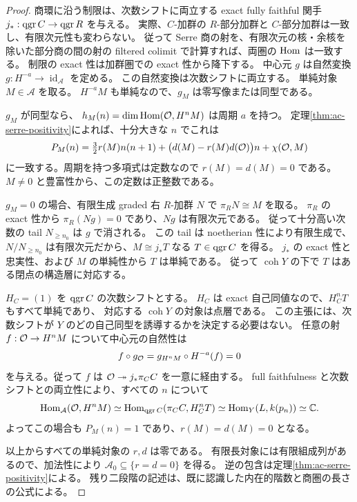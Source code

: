 \begin{proof}
商環に沿う制限は、次数シフトに両立する exact fully faithful 関手
$j_*:\operatorname{qgr} C\to\operatorname{qgr} R$ を与える。
実際、$C$-加群の $R$-部分加群と $C$-部分加群は一致し、有限次元性も変わらない。
従って Serre 商の射を、有限次元の核・余核を除いた部分商の間の射の
filtered colimit で計算すれば、両圏の $\operatorname{Hom}$ は一致する。
制限の exact 性は加群圏での exact 性から降下する。
中心元 $g$ は自然変換 $g:H^{-a}\to\operatorname{id}_{\mathcal A}$ を定める。
この自然変換は次数シフトに両立する。
単純対象 $M\in\mathcal A$ を取る。
$H^{-a}M$ も単純なので、$g_M$ は零写像または同型である。

$g_M$ が同型なら、
$h_M(n)=\dim\operatorname{Hom}(\mathcal O,H^nM)$ は周期 $a$ を持つ。
定理\ref{thm:ac-serre-positivity}によれば、十分大きな $n$ でこれは
\[
 P_M(n)=\tfrac32r(M)n(n+1)
       +\bigl(d(M)-r(M)d(\mathcal O)\bigr)n+\chi(\mathcal O,M)
\]
に一致する。周期を持つ多項式は定数なので $r(M)=d(M)=0$ である。
$M\ne0$ と豊富性から、この定数は正整数である。

$g_M=0$ の場合、有限生成 graded 右 $R$-加群 $N$ で
$\pi_RN\cong M$ を取る。
$\pi_R$ の exact 性から $\pi_R(Ng)=0$ であり、$Ng$ は有限次元である。
従って十分高い次数の tail $N_{\ge n_0}$ は $g$ で消される。
この tail は noetherian 性により有限生成で、
$N/N_{\ge n_0}$ は有限次元だから、$M\cong j_*T$ なる $T\in\operatorname{qgr} C$ を得る。
$j_*$ の exact 性と忠実性、および $M$ の単純性から $T$ は単純である。
従って $\operatorname{coh}Y$ の下で $T$ はある閉点の構造層に対応する。

$H_C=(1)$ を $\operatorname{qgr} C$ の次数シフトとする。
$H_C$ は exact 自己同値なので、$H_C^nT$ もすべて単純であり、
対応する $\operatorname{coh}Y$ の対象は点層である。
この主張には、次数シフトが $Y$ のどの自己同型を誘導するかを決定する必要はない。
任意の射 $f:\mathcal O\to H^nM$ について中心元の自然性は
\[
 f\circ g_{\mathcal O}=g_{H^nM}\circ H^{-a}(f)=0
\]
を与える。従って $f$ は $\mathcal O\twoheadrightarrow j_*\pi_CC$ を一意に経由する。
full faithfulness と次数シフトとの両立性により、すべての $n$ について
\[
 \operatorname{Hom}_{\mathcal A}(\mathcal O,H^nM)
 \simeq\operatorname{Hom}_{\operatorname{qgr} C}(\pi_CC,H_C^nT)
 \simeq\operatorname{Hom}_Y(L,k(p_n))\simeq\mathbb C.
\]
よってこの場合も $P_M(n)=1$ であり、$r(M)=d(M)=0$ となる。

以上からすべての単純対象の $r,d$ は零である。
有限長対象には有限組成列があるので、加法性により
$\mathcal A_0\subseteq\{r=d=0\}$ を得る。
逆の包含は定理\ref{thm:ac-serre-positivity}による。
残り二段階の記述は、既に認識した内在的階数と商圏の長さの公式による。
\end{proof}


